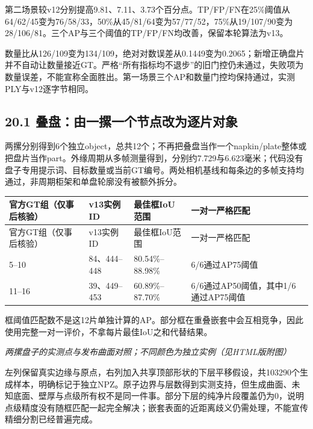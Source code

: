 \documentclass[UTF8,fontset=fandol]{ctexart}
\begin{document}
第二场景较v12分别提高9.81、7.11、3.73个百分点。TP/FP/FN在25\%阈值从64/62/45变为76/58/33，50\%从45/81/64变为57/77/52，75\%从19/107/90变为28/106/81。三个AP与三个阈值的TP/FP/FN均改善，保留本轮算法为v13。



数量比从126/109变为134/109，绝对对数误差从0.1449变为0.2065；新增正确盘片并不自动让数量接近GT。严格“所有指标均不退步”的旧门控仍未通过，失败项为数量误差，不能宣称全面胜出。第一场景三个AP和数量门控均保持通过，实测PLY与v12逐字节相同。



\subsection*{20.1 叠盘：由一摞一个节点改为逐片对象}

两摞分别得到6个独立object，总共12个；不再把叠盘当作一个napkin/plate整体或把盘片当作part。外缘周期从多帧测量得到，分别约7.729与6.623毫米；代码没有盘子专用提示词、目标数量或当前GT编号。两处相机基线和每条边的多帧支持均通过，非周期柜架和单盘轮廓没有被额外拆分。



{\small
\begin{longtable}{|p{}|p{}|p{}|p{}|}
\hline
官方GT组（仅事后核验） & v13实例ID & 最佳框IoU范围 & 一对一严格匹配 \\ \hline
\endfirsthead
\hline
官方GT组（仅事后核验） & v13实例ID & 最佳框IoU范围 & 一对一严格匹配 \\ \hline
\endhead
5–10 & 84、444–448 & 80.54\%–88.98\% & 6/6通过AP75阈值 \\ \hline
11–16 & 39、449–453 & 60.89\%–87.70\% & 6/6通过AP50阈值，其中1/6通过AP75阈值 \\ \hline
\end{longtable}
}

框阈值匹配数不是这12片单独计算的AP。部分框在重叠嵌套中会互相竞争，因此使用完整一对一评价，不拿每片最佳IoU之和代替结果。



\textit{两摞盘子的实测点与发布曲面对照；不同颜色为独立实例（见HTML版附图）}



左列保留真实边缘与原点，右列加入共享顶部形状的下层平移假设，共103290个生成样本，明确标记于独立NPZ。原子边界与层数得到实测支持，但生成曲面、未知底面、壁厚与点级所有权不是同一件事。部分下层的纯净片段覆盖仍为0，说明点级精度没有随框匹配一起完全解决；嵌套表面的近距离歧义仍需处理，不能宣传精细分割已经普遍完成。
\end{document}
